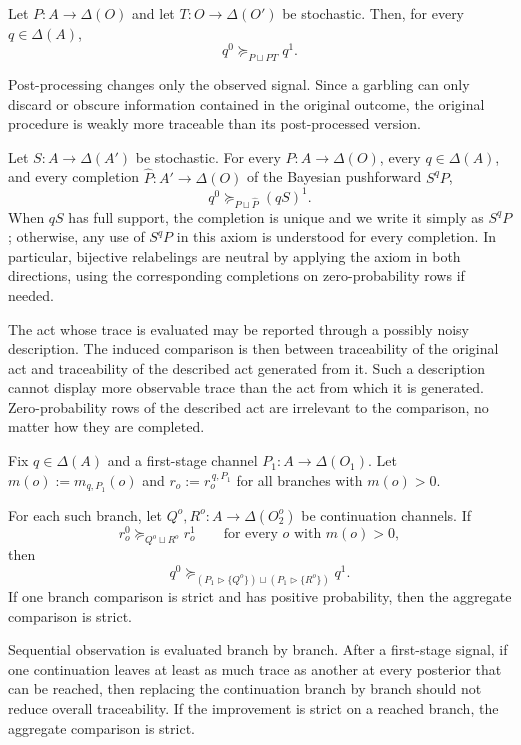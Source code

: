 \documentclass[11pt,a4paper]{article}
\theoremstyle{definition}
\newcommand{\1}{\mathbf 1}
\begin{document}
\begin{description}[leftmargin=*,style=sameline]
\item[(A4) Outcome post-processing aversion.]
Let $P:A\to\Delta(O)$ and let $T:O\to\Delta(O')$ be stochastic.  Then, for every $q\in\Delta(A)$,
\[
q^0\succeq_{P\sqcup PT}q^1.
\]

Post-processing changes only the observed signal.  Since a garbling can only discard or obscure information contained in
the original outcome, the original procedure is weakly more traceable than its post-processed version.

\item[(A5) Action-coarsening aversion.]
Let $S:A\to\Delta(A')$ be stochastic.  For every $P:A\to\Delta(O)$, every $q\in\Delta(A)$, and every completion
$\widehat P:A'\to\Delta(O)$ of the Bayesian pushforward $S^qP$,
\[
q^0\succeq_{P\sqcup \widehat P}(qS)^1.
\]
When $qS$ has full support, the completion is unique and we write it simply as $S^qP$; otherwise, any use of $S^qP$ in this
axiom is understood for every completion.  In particular, bijective relabelings are neutral by applying the axiom in both
directions, using the corresponding completions on zero-probability rows if needed.

The act whose trace is evaluated may be reported through a possibly noisy description.  The induced comparison is then
between traceability of the original act and traceability of the described act generated from it.  Such a description
cannot display more observable trace than the act from which it is generated.  Zero-probability rows of the described act
are irrelevant to the comparison, no matter how they are completed.

\item[(A6) Branchwise continuation monotonicity.]
Fix $q\in\Delta(A)$ and a first-stage channel $P_1:A\to\Delta(O_1)$.  Let
$m(o):=m_{q,P_1}(o)$ and $r_o:=r_o^{\,q,P_1}$ for all branches with $m(o)>0$.

For each such branch, let $Q^o,R^o:A\to\Delta(O_2^o)$ be continuation channels.  If
\[
r_o^0\succeq_{Q^o\sqcup R^o}r_o^1
\qquad\text{for every }o\text{ with }m(o)>0,
\]
then
\[
q^0
\succeq_{(P_1\triangleright\{Q^o\})\sqcup(P_1\triangleright\{R^o\})}
q^1.
\]
If one branch comparison is strict and has positive probability, then the aggregate comparison is strict.

Sequential observation is evaluated branch by branch.  After a first-stage signal, if one continuation leaves at least as
much trace as another at every posterior that can be reached, then replacing the continuation branch by branch should not
reduce overall traceability.  If the improvement is strict on a reached branch, the aggregate comparison is strict.

\end{description}
\end{document}
